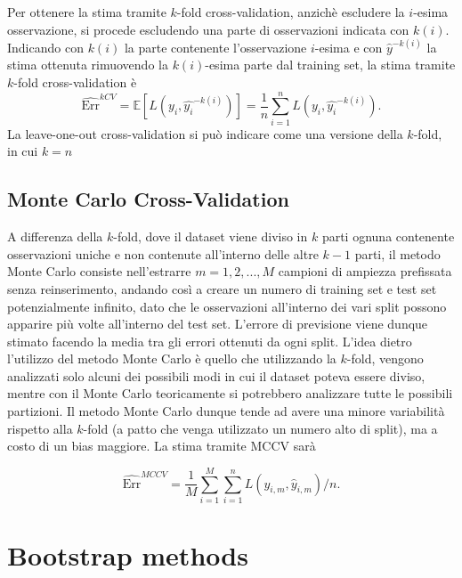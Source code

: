 Per ottenere la stima tramite $k$-fold cross-validation, anzichè escludere la $i$-esima osservazione, si procede escludendo una parte di osservazioni indicata con $k(i)$. Indicando con $k(i)$ la parte contenente l'osservazione $i$-esima e con $\hat{y}^{-k(i)}$ la stima ottenuta rimuovendo la $k(i)$-esima parte dal training set, la stima tramite $k$-fold cross-validation è
\begin{equation}
\widehat{\text{Err}}^{kCV} = \mathbb{E}[L(y_i, \hat{y_i}^{-k(i)})] = \frac{1}{n} \sum_{i=1}^{n} L(y_i, \hat{y_i}^{-k(i)}).
\end{equation}
La leave-one-out cross-validation si può indicare come una versione della $k$-fold, in cui $k = n$

\subsection{Monte Carlo Cross-Validation}
\label{sec:sezione5.1.3}

A differenza della $k$-fold, dove il dataset viene diviso in $k$ parti ognuna contenente osservazioni uniche e non contenute all'interno delle altre $k-1$ parti, il metodo Monte Carlo consiste nell'estrarre $m = 1,2,...,M$ campioni di ampiezza prefissata senza reinserimento, andando così a creare un numero di training set e test set potenzialmente infinito, dato che le osservazioni all'interno dei vari split possono apparire più volte all'interno del test set. L'errore di previsione viene dunque stimato facendo la media tra gli errori ottenuti da ogni split.
L'idea dietro l'utilizzo del metodo Monte Carlo è quello che utilizzando la $k$-fold, vengono analizzati solo alcuni dei possibili modi in cui il dataset poteva essere diviso, mentre con il Monte Carlo teoricamente si potrebbero analizzare tutte le possibili partizioni. Il metodo Monte Carlo dunque tende ad avere una minore variabilità rispetto alla $k$-fold (a patto che venga utilizzato un numero alto di split), ma a costo di un bias maggiore.
La stima tramite MCCV sarà

\begin{equation}
\widehat{\text{Err}}^{MCCV} = \frac{1}{M} \sum_{i=1}^{M} \sum_{i=1}^{n}L(y_{i,m}, \hat{y}_{i,m})/n.
\end{equation}


\section{Bootstrap methods}
\label{sec:sezione5.4}


